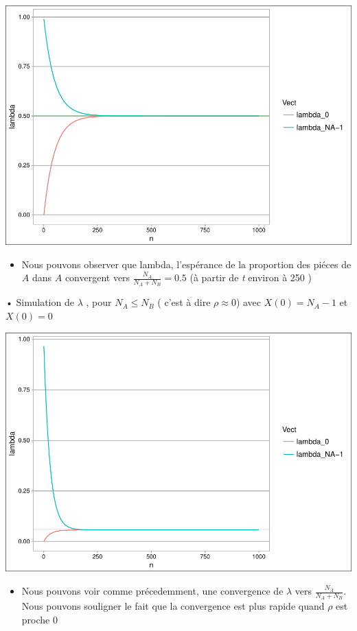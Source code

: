 \documentclass[11pt,]{article}
\providecommand{\tightlist}{%
  \setlength{\itemsep}{0pt}\setlength{\parskip}{0pt}}
\begin{document}
\includegraphics{money_exchange_files/figure-latex/unnamed-chunk-7-1.pdf}

\begin{itemize}
\tightlist
\item
  Nous pouvons observer que lambda, l'espérance de la proportion des
  piéces de \(A\) dans \(A\) convergent vers \(\frac{N_A}{N_A+N_B}=0.5\)
  (à partir de \emph{t} environ à 250 )
\end{itemize}

\newpage  

• Simulation de \(\lambda\) , pour \(N_A \leq N_B\) ( c'est à dire
\(\rho \approx 0\)) avec \(X(0)=N_A-1\) et \(X(0)=0\)

\includegraphics{money_exchange_files/figure-latex/unnamed-chunk-8-1.pdf}

\begin{itemize}
\tightlist
\item
  Nous pouvons voir comme précedemment, une convergence de \(\lambda\)
  vers \(\frac{N_A}{N_A+N_B}\). Nous pouvons souligner le fait que la
  convergence est plus rapide quand \(\rho\) est proche \(0\)
\end{itemize}
\end{document}
